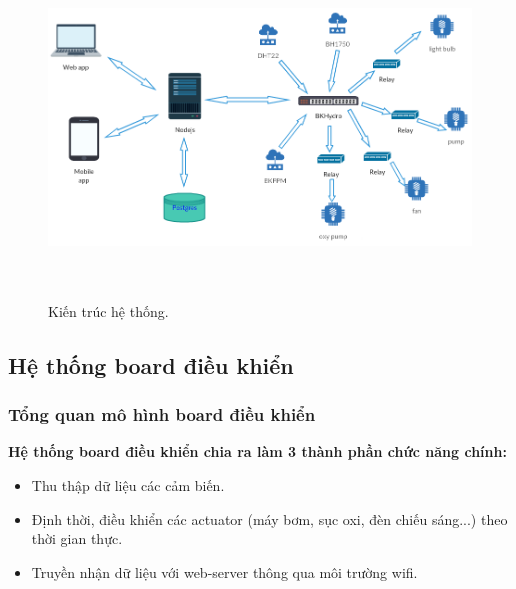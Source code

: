 \documentclass[a4paper,12pt,oneside]{article}
\begin{document}
\begin{figure}[H]
	\centering
	\includegraphics[height=9cm,width=13cm]{hinh/system.png}
	\caption{Kiến trúc hệ thống.}
	\label{fig:system}
\end{figure}


\subsection{Hệ thống board điều khiển}

\subsubsection{Tổng quan mô hình board điều khiển}

\noindent \textbf{Hệ thống board điều khiển chia ra làm 3 thành phần chức năng chính:}
\begin{itemize}
\item Thu thập dữ liệu các cảm biến.
\item Định thời, điều khiển các actuator (máy bơm, sục oxi, đèn chiếu sáng...) theo thời gian thực.
\item Truyền nhận dữ liệu với web-server thông qua môi trường wifi.

\end{itemize}
\end{document}
